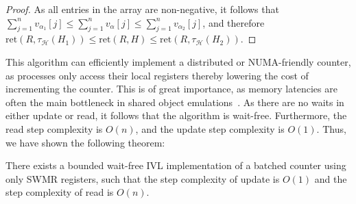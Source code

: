 \begin{proof}
    As all entries in the array are non-negative, it follows that $\sum_{j=1}^n v_{\alpha_1}[j] \leq \sum_{j=1}^n v_{\alpha}[j] \leq \sum_{j=1}^n v_{\alpha_2}[j]$, and
    therefore $\text{ret}(R, \tau_\mathcal{H}(H_1)) \leq \text{ret}(R, H) \leq \text{ret}(R, \tau_\mathcal{H}(H_2))$.
\end{proof}

This algorithm can efficiently implement a distributed or NUMA-friendly counter, as processes
only access their local registers  thereby lowering the cost of incrementing the counter.
This is of great importance, as memory latencies are often the main bottleneck in shared object emulations~\cite{mahapatra1999processor}.
As there are no waits in
either {\sc update} or {\sc read}, it follows that the algorithm is wait-free. Furthermore, the {\sc read} step complexity
is $O(n)$, and the {\sc update} step complexity is $O(1)$. Thus, we have shown the following theorem:
\begin{theorem}
    There exists a bounded wait-free IVL implementation of a batched counter using only SWMR registers, such that the step complexity of {\sc update} is $O(1)$
    and the step complexity of {\sc read} is $O(n)$.
\end{theorem}



